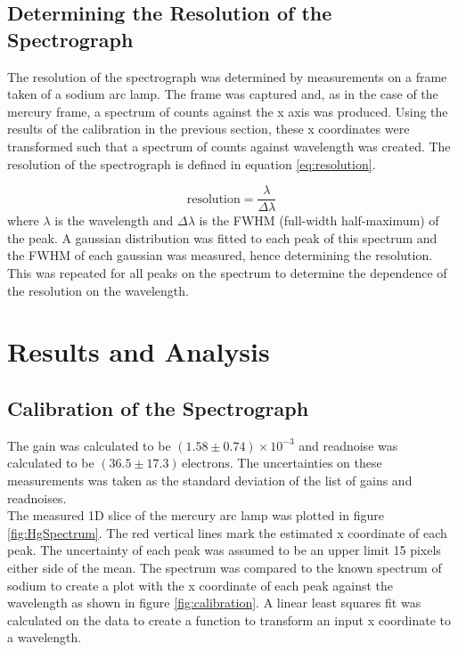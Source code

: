 \documentclass[a4paper,12pt,twocolumn]{article}
\let\cite=\supercite
\begin{document}
		\subsection{Determining the Resolution of the Spectrograph}
			The resolution of the spectrograph was determined by measurements on a frame taken of a sodium arc lamp. The frame was captured and, as in the case of the mercury frame, a spectrum of counts against the x axis was produced. Using the results of the calibration in the previous section, these x coordinates were transformed such that a spectrum of counts against wavelength was created. The resolution of the spectrograph is defined in equation \ref{eq:resolution}\cite{manual}.
			
			\begin{equation}
				\text{resolution} = \frac{\lambda}{\Delta \lambda}
				\label{eq:resolution}
			\end{equation} where $\lambda$ is the wavelength and $\Delta \lambda$ is the FWHM (full-width half-maximum) of the peak. A gaussian distribution was fitted to each peak of this spectrum and the FWHM of each gaussian was measured, hence determining the resolution. This was repeated for all peaks on the spectrum to determine the dependence of the resolution on the wavelength.
	
	\section{Results and Analysis}
		
		\subsection{Calibration of the Spectrograph}
		The gain was calculated to be $(1.58 \pm 0.74)\times 10^{-3}$ and readnoise was calculated to be $(36.5 \pm 17.3) \,\text{electrons}$. The uncertainties on these measurements was taken as the standard deviation of the list of gains and readnoises.\\
		
		The measured 1D slice of the mercury arc lamp was plotted in figure \ref{fig:HgSpectrum}. The red vertical lines mark the estimated x coordinate of each peak. The uncertainty of each peak was assumed to be an upper limit 15 pixels either side of the mean. The spectrum was compared to the known spectrum of sodium to create a plot with the x coordinate of each peak against the wavelength as shown in figure \ref{fig:calibration}. A linear least squares fit was calculated on the data to create a function to transform an input x coordinate to a wavelength.
		
\end{document}
